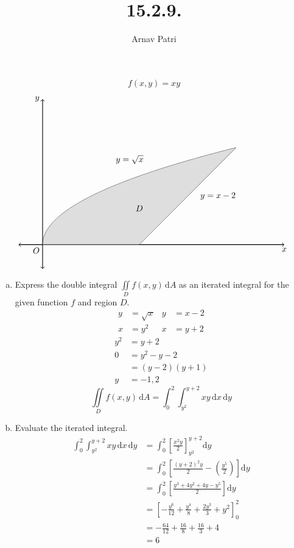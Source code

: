 \documentclass[12pt]{article}
\title{15.2.9.}
\author{Arnav Patri}
\renewcommand{\d}{\text{d}}
\begin{document}
	\pagestyle{empty}
	\maketitle
		\[f(x, y) = xy\]
		\[\begin{tikzpicture}[scale = 2]
			\draw[<->, thick] (-0.5, 0) -- (5, 0) node[below]{$x$};
			\draw[<->, thick] (0, -0.5) -- (0, 3) node[left]{$y$};
			\node[anchor = north east] at (0, 0) {$O$};
			\draw[domain = 0:4, smooth, samples = 300, variable = \x] plot({\x}, {sqrt(\x)});
				\node[above] at (1.8, 1.6) {$y = \sqrt{x}$};
			\draw[] (2, 0) -- (4, 2);
				\node[right] at (3.2, 1) {$y = x - 2$};
			\fill[lightgray, opacity = 0.5, domain = 0:4, smooth, samples = 300, variable = \x] (0, 0) -- plot({\x}, {sqrt(\x)}) -- (2, 0);
			\node at (2, 0.75) {$D$};
		\end{tikzpicture}\]
	\begin{enumerate}[(a)]
		\item 
			Express the double integral $\iint\limits_D f(x, y)\,\d A$ as an iterated integral for the given function $f$ and region $D$. 
			\begin{align*}
				y &= \sqrt{x} &
						y &= x - 2 \\
				x &= y^2 &
						x &= y + 2
			\end{align*}
			\begin{align*}
				y^2 &= y + 2 \\
				0 &= y^2 - y - 2 \\
					&= (y - 2)(y + 1) \\
				y &= -1, 2	
			\end{align*}
			\[\iint\limits_D f(x, y)\,\d A = \int_0^2\int_{y^2}^{y + 2} xy\,\d x\,\d y\]
		\item
			Evaluate the iterated integral.
			\begin{align*}
				\int_0^2\int_{y^2}^{y + 2} xy\,\d x\,\d y &= \int_0^2\left[\frac{x^2y}{2}\right]_{y^2}^{y + 2}\d y \\
					&= \int_0^2\left[\frac{(y + 2)^2y}{2} - \left(\frac{y^5}{2}\right)\right]\d y \\
					&= \int_0^2\left[\frac{y^3 + 4y^2 + 4y - y^5}{2}\right]\d y \\
					&= \left[-\frac{y^6}{12} + \frac{y^4}{8} + \frac{2y^3}{3} + y^2\right]_0^2 \\
					&= -\frac{64}{12} + \frac{16}{8} + \frac{16}{3} + 4 \\
					&= 6
			\end{align*}
	\end{enumerate}
\end{document}
